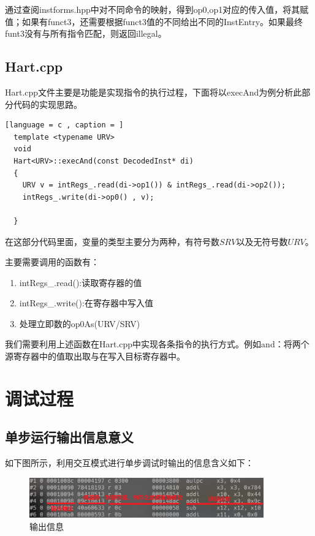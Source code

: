 \documentclass{../source/zjureport}
\begin{document}
    通过查阅instforms.hpp中对不同命令的映射，得到op0,op1对应的传入值，将其赋值；如果有funct3，还需要根据funct3值的不同给出不同的InstEntry。如果最终funt3没有与所有指令匹配，则返回illegal。

    \subsection{Hart.cpp}
    Hart.cpp文件主要是功能是实现指令的执行过程，下面将以execAnd为例分析此部分代码的实现思路。
    \begin{lstlisting}[language = c , caption = ]
  template <typename URV>
  void
  Hart<URV>::execAnd(const DecodedInst* di)
  {
    URV v = intRegs_.read(di->op1()) & intRegs_.read(di->op2());
    intRegs_.write(di->op0() , v);
      
  }
    \end{lstlisting}
    
    在这部分代码里面，变量的类型主要分为两种，有符号数$SRV$以及无符号数$URV$。

    主要需要调用的函数有：
    \begin{enumerate}
      \item intRegs_.read():读取寄存器的值
      \item intRegs_.write():在寄存器中写入值
      \item 处理立即数的op0As(URV/SRV)
    \end{enumerate}

    我们需要利用上述函数在Hart.cpp中实现各条指令的执行方式。例如and：将两个源寄存器中的值取出取与在写入目标寄存器中。

\section{调试过程}
    \subsection{单步运行输出信息意义}
    如下图所示，利用交互模式进行单步调试时输出的信息含义如下：
    \begin{figure}[H]
      \centering
      \includegraphics[width = 0.9\textwidth]{figure/debug.png}
      \caption{输出信息}
    \end{figure}
    
\end{document}
